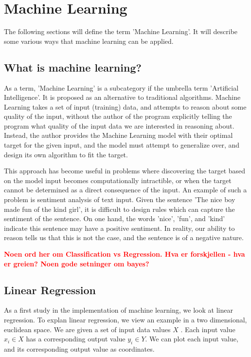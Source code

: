 \section{Machine Learning}

The following sections will define the term 'Machine Learning'. 
It will describe some various ways that machine learning can be applied.



\subsection{What is machine learning?}

As a term, 'Machine Learning' is a subcategory if the umbrella term 'Artificial Intelligence'.
It is proposed as an alternative to traditional algorithms. 
Machine Learning takes a set of input (training) data, and attempts to reason about some quality of the input, 
without the author of the program explicitly telling the program what quality of the input data we are interested in reasoning about.
Instead, the author provides the Machine Learning model with their optimal target for the given input,
and the model must attempt to generalize over, and design its own algorithm to fit the target.

This approach has become useful in problems where discovering the target based on the model input becomes computationally intractible,
or when the target cannot be determined as a direct consequence of the input. 
An example of such a problem is sentiment analysis of text input. 
Given the sentence 'The nice boy made fun of the kind girl', 
it is difficult to design rules which can capture the sentiment of the sentence.
On one hand, the words 'nice', 'fun', and 'kind' indicate this sentence may have a positive sentiment.
In reality, our ability to reason tells us that this is not the case, and the sentence is of a negative nature.

\textcolor{red}{\textbf{Noen ord her om Classification vs Regression. Hva er forskjellen - hva er greien? Noen gode setninger om bayes?}}


\subsection{Linear Regression}
\label{subsection:linreg}

As a first study in the implementation of machine learning, we look at linear regression.
To explan linear regression, we view an example in a two dimensional, euclidean space.
We are given a set of input data values $ X $ . Each input value $ x_i \in X $ has a corresponding output value $ y_i \in Y $.
We can plot each input value, and its corresponding output value as coordinates.


